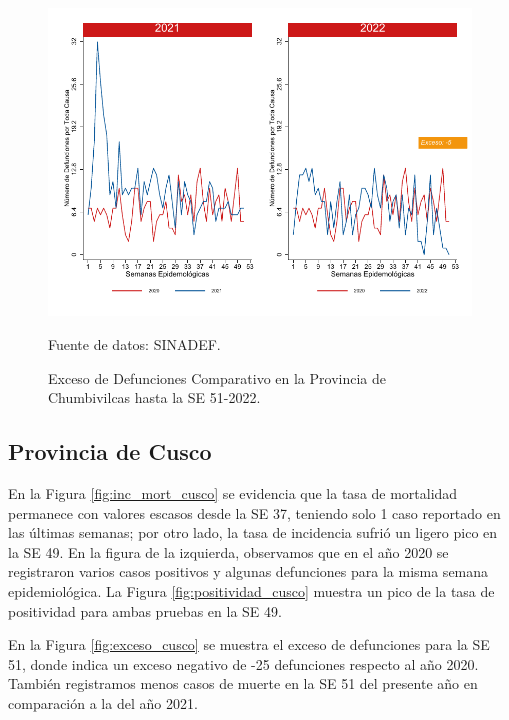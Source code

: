 \documentclass[12pt,a4paper,openany]{book}
\begin{document}
	\begin{figure}[h]
		\caption{Exceso de Defunciones Comparativo en la Provincia de Chumbivilcas hasta la SE 51-2022.}\label{fig:exceso_chumbivilcas}
		\begin{center}
			\includegraphics[width=0.7\linewidth]{../figuras/exceso_6.pdf}
		\end{center}
		{\footnotesize {Fuente de datos: SINADEF.}}
	\end{figure}
	
	\clearpage
	
	\subsection*{Provincia de Cusco}
	\noindent En la Figura \ref{fig:inc_mort_cusco} se evidencia que la tasa de mortalidad permanece con valores escasos desde la SE 37, teniendo solo 1 caso reportado en las últimas semanas; por otro lado, la tasa de incidencia sufrió un ligero pico en la SE 49. En la figura de la izquierda, observamos que en el año 2020 se registraron varios casos positivos y algunas defunciones para la misma semana epidemiológica.
	\noindent La  Figura \ref{fig:positividad_cusco} muestra un pico de la tasa de positividad para ambas pruebas en la SE 49.
	
	En la Figura \ref{fig:exceso_cusco} se muestra el exceso de defunciones para la SE 51, donde indica un exceso negativo de -25 defunciones respecto al año 2020. También registramos menos casos de muerte en la SE 51 del presente año en comparación a la del año 2021.
	
\end{document}
